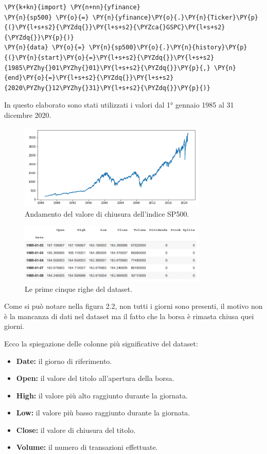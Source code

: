 \documentclass[12pt,a4paper,twoside,openright]{book}
\begin{document}
\begin{Verbatim}[commandchars=\\\{\}]
\PY{k+kn}{import} \PY{n+nn}{yfinance}
\PY{n}{sp500} \PY{o}{=} \PY{n}{yfinance}\PY{o}{.}\PY{n}{Ticker}\PY{p}{(}\PY{l+s+s2}{\PYZdq{}}\PY{l+s+s2}{\PYZca{}GSPC}\PY{l+s+s2}{\PYZdq{}}\PY{p}{)}
\PY{n}{data} \PY{o}{=} \PY{n}{sp500}\PY{o}{.}\PY{n}{history}\PY{p}{(}\PY{n}{start}\PY{o}{=}\PY{l+s+s2}{\PYZdq{}}\PY{l+s+s2}{1985\PYZhy{}01\PYZhy{}01}\PY{l+s+s2}{\PYZdq{}}\PY{p}{,} \PY{n}{end}\PY{o}{=}\PY{l+s+s2}{\PYZdq{}}\PY{l+s+s2}{2020\PYZhy{}12\PYZhy{}31}\PY{l+s+s2}{\PYZdq{}}\PY{p}{)}
\end{Verbatim}

In questo elaborato sono stati utilizzati i valori dal 1° gennaio 1985 al 31 dicembre 2020.
\begin{figure}[H]
\centering
\includegraphics[width=0.8\textwidth]{images/sp500.png}
\caption{Andamento del valore di chiusura dell'indice SP500.}
\label{fig:rapp_file}
\end{figure}

\begin{figure}[H]
\centering
\includegraphics[width=0.8\textwidth]{images/data1.png}
\caption{Le prime cinque righe del dataset.}
\label{fig:rapp_file}
\end{figure}

Come si può notare nella figura 2.2, non tutti i giorni sono presenti, il motivo non è la mancanza di dati nel dataset ma il fatto che la borsa è rimasta chiusa quei giorni.

Ecco la spiegazione delle colonne più significative del dataset:
\begin{itemize}
    \item \textbf{Date:} il giorno di riferimento.
    \item \textbf{Open:} il valore del titolo all’apertura della borsa.
    \item \textbf{High:} il valore più alto raggiunto durante la giornata.
    \item \textbf{Low:} il valore più basso raggiunto durante la giornata.
    \item \textbf{Close:} il valore di chiusura del titolo.
    \item \textbf{Volume:} il numero di transazioni effettuate.
\end{itemize}
\end{document}
